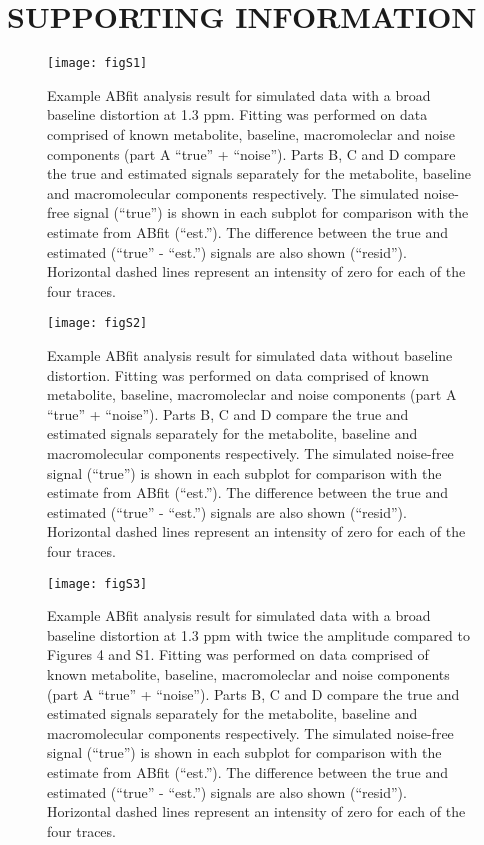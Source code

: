 \documentclass[num-refs]{wiley-article}
\begin{document}
\section*{SUPPORTING INFORMATION}

\begin{figure}[H]
  \begin{center}
    \texttt{[image: figS1]}
    \caption{Example ABfit analysis result for simulated data with a broad baseline distortion at 1.3 ppm. Fitting was performed on data comprised of known metabolite, baseline, macromoleclar and noise components (part A ``true'' + ``noise''). Parts B, C and D compare the true and estimated signals separately for the metabolite, baseline and macromolecular components respectively. The simulated noise-free signal (``true'') is shown in each subplot for comparison with the estimate from ABfit (``est.''). The difference between the true and estimated (``true'' - ``est.'') signals are also shown (``resid''). Horizontal dashed lines represent an intensity of zero for each of the four traces.}
  \end{center}
\end{figure}

\begin{figure}
  \begin{center}
    \texttt{[image: figS2]}
    \caption{Example ABfit analysis result for simulated data without baseline distortion. Fitting was performed on data comprised of known metabolite, baseline, macromoleclar and noise components (part A ``true'' + ``noise''). Parts B, C and D compare the true and estimated signals separately for the metabolite, baseline and macromolecular components respectively. The simulated noise-free signal (``true'') is shown in each subplot for comparison with the estimate from ABfit (``est.''). The difference between the true and estimated (``true'' - ``est.'') signals are also shown (``resid''). Horizontal dashed lines represent an intensity of zero for each of the four traces.}
  \end{center}
\end{figure}

\begin{figure}
  \begin{center}
    \texttt{[image: figS3]}
    \caption{Example ABfit analysis result for simulated data with a broad baseline distortion at 1.3 ppm with twice the amplitude compared to Figures 4 and S1. Fitting was performed on data comprised of known metabolite, baseline, macromoleclar and noise components (part A ``true'' + ``noise''). Parts B, C and D compare the true and estimated signals separately for the metabolite, baseline and macromolecular components respectively. The simulated noise-free signal (``true'') is shown in each subplot for comparison with the estimate from ABfit (``est.''). The difference between the true and estimated (``true'' - ``est.'') signals are also shown (``resid''). Horizontal dashed lines represent an intensity of zero for each of the four traces.}
  \end{center}
\end{figure}
\end{document}
